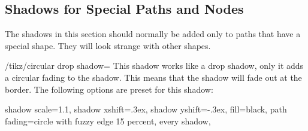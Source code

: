 \subsection{Shadows for Special Paths and Nodes}

The shadows in this section should normally be added only to paths that have a
special shape. They will look strange with other shapes.

\begin{key}{/tikz/circular drop shadow=}
    This shadow works like a drop shadow, only it adds a circular fading to the
    shadow. This means that the shadow will fade out at the border. The
    following options are preset for this shadow:
\begin{codeexample}
  shadow scale=1.1, shadow xshift=.3ex, shadow yshift=-.3ex,
  fill=black, path fading={circle with fuzzy edge 15 percent},
  every shadow,
\end{codeexample}

\begin{codeexample}[]
\end{codeexample}
\end{key}

